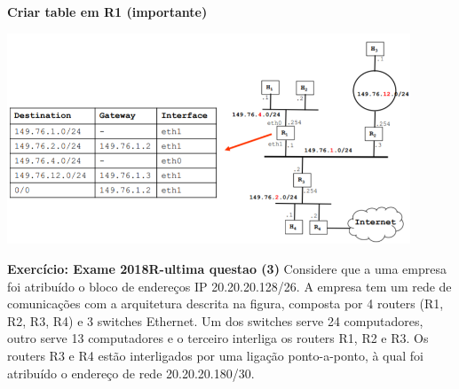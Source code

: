 \documentclass{article}
\begin{document}
\textbf{Criar table em R1 (importante)}
\begin{center}
    \includegraphics[width=12cm]{images/RCOM21.png}
\end{center}

\textbf{Exercício: Exame 2018R-ultima questao (3)}
Considere que a uma empresa foi atribuído o bloco de endereços IP 20.20.20.128/26. A empresa tem um rede de comunicações com a arquitetura descrita na figura, composta por 4 routers (R1, R2, R3, R4) e 3 switches Ethernet. 
Um dos switches serve 24 computadores, outro serve 13 computadores e o terceiro interliga os routers R1, R2 e R3. Os routers R3 e R4 estão interligados por uma ligação ponto-a-ponto, à qual foi atribuído o endereço de rede 20.20.20.180/30.
\end{document}
